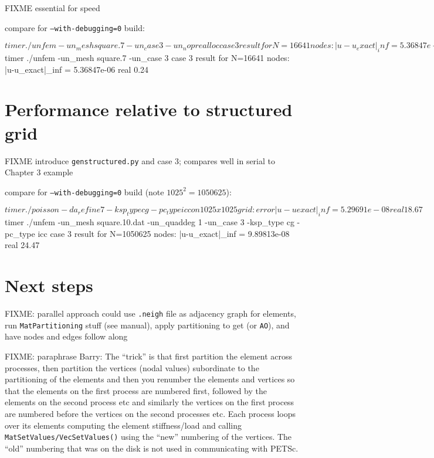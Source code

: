 FIXME essential for speed

compare for \texttt{--with-debugging=0} build:
\begin{cline}
$ timer ./unfem -un_mesh square.7 -un_case 3 -un_noprealloc
case 3 result for N=16641 nodes:  |u-u_exact|_inf = 5.36847e-06
real 6.55
$ timer ./unfem -un_mesh square.7 -un_case 3
case 3 result for N=16641 nodes:  |u-u_exact|_inf = 5.36847e-06
real 0.24
\end{cline}

\section{Performance relative to \pDMDA structured grid}

FIXME introduce \texttt{genstructured.py} and case 3; compares well in serial to Chapter 3 example

compare for \texttt{--with-debugging=0} build (note $1025^2=1050625$):
\begin{cline}
$ timer ./poisson -da_refine 7 -ksp_type cg -pc_type icc
on 1025 x 1025 grid:  error |u-uexact|_inf = 5.29691e-08
real 18.67
$ timer ./unfem -un_mesh square.10.dat -un_quaddeg 1 -un_case 3 -ksp_type cg -pc_type icc
case 3 result for N=1050625 nodes:  |u-u_exact|_inf = 9.89813e-08
real 24.47
\end{cline}

\section{Next steps}

FIXME: parallel approach could use \Triangle \texttt{.neigh} file as adjacency graph for elements, run \texttt{MatPartitioning} stuff (see manual), apply partitioning to get \pIS (or \texttt{AO}), and have nodes and edges follow along

FIXME: paraphrase Barry: The ``trick'' is that first partition the element across processes, then partition the vertices (nodal values) subordinate to the partitioning of the elements and then you renumber the elements and vertices so that the elements on the first process are numbered first, followed by the elements on the second process etc and similarly the vertices on the first process are numbered before the vertices on the second processes etc.  Each process loops over its elements computing the element stiffness/load and calling \texttt{MatSetValues/VecSetValues()} using the ``new'' numbering of the vertices.  The ``old'' numbering that was on the disk is not used in communicating with PETSc.

